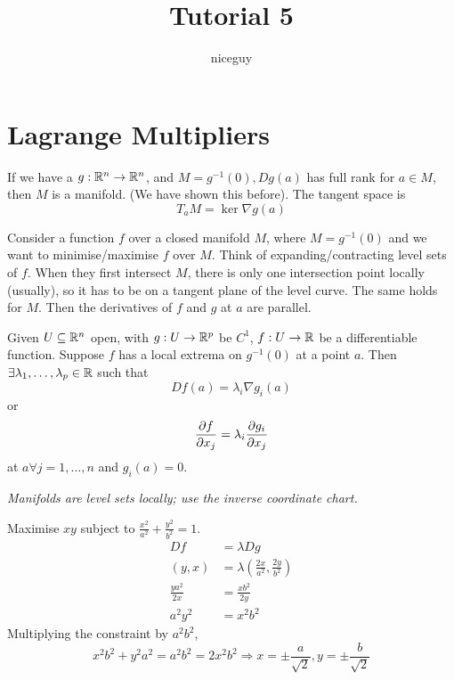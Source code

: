 \documentclass[12pt]{article}
\title{Tutorial 5}
\author{niceguy}
\begin{document}
\maketitle

\section{Lagrange Multipliers}

If we have a $g: \mathbb{R}^n \rightarrow \mathbb{R}^n$, and $M = g^{-1}(0), Dg(a)$ has full rank for $a \in M$, then $M$ is a manifold. (We have shown this before). The tangent space is
$$T_aM = \ker \nabla g(a)$$

Consider a function $f$ over a closed manifold $M$, where $M = g^{-1}(0)$ and we want to minimise/maximise $f$ over $M$. Think of expanding/contracting level sets of $f$. When they first intersect $M$, there is only one intersection point locally (usually), so it has to be on a tangent plane of the level curve. The same holds for $M$. Then the derivatives of $f$ and $g$ at $a$ are parallel.

\begin{thm}
    Given $U \subseteq \mathbb{R}^n$ open, with $g: U \rightarrow \mathbb{R}^p$ be $C^1$, $f:U \rightarrow \mathbb{R}$ be a differentiable function. Suppose $f$ has a local extrema on $g^{-1}(0)$ at a point $a$. Then $\exists \lambda_1,\dots,\lambda_p \in \mathbb{R}$ such that
    $$Df(a) = \lambda_i\nabla g_i(a)$$
    or
    $$\frac{\partial f}{\partial x_j} = \lambda_i \frac{\partial g_i}{\partial x_j}$$
    at $a \forall j = 1,\dots,n$ and $g_i(a) = 0$.
\end{thm}

\textit{Manifolds are level sets locally; use the inverse coordinate chart.}

\begin{ex}
    Maximise $xy$ subject to $\frac{x^2}{a^2} + \frac{y^2}{b^2} = 1$. \\
    \begin{align*}
        Df &= \lambda Dg \\
        (y, x) &= \lambda \left(\frac{2x}{a^2}, \frac{2y}{b^2}\right) \\
        \frac{ya^2}{2x} &= \frac{xb^2}{2y} \\
        a^2y^2 &= x^2b^2
    \end{align*}
    Multiplying the constraint by $a^2b^2$,
    $$x^2b^2 + y^2a^2 = a^2b^2 = 2x^2b^2 \Rightarrow x = \pm\frac{a}{\sqrt{2}}, y = \pm\frac{b}{\sqrt{2}}$$
\end{ex}
\end{document}
